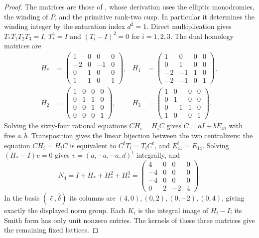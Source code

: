 \begin{proof}
The matrices are those of \citet[Proposition~4.2]{ViaTwo26push}, whose
derivation uses the elliptic monodromies, the winding of $P$,
and the primitive rank-two cusp.  In particular it determines
the winding integer by the saturation index $d^2=1$.  Direct multiplication gives
$T_*T_1T_2T_3=I$, $T_*^4=I$ and
$(T_i-I)^2=0$ for $i=1,2,3$.
The dual homology matrices are
\[
\begin{aligned}
 H_*&=\begin{pmatrix}1&0&0&0\\-2&0&-1&0\\0&1&0&0\\1&1&0&1\end{pmatrix},&
 H_1&=\begin{pmatrix}1&0&0&0\\0&1&0&0\\-2&-1&1&0\\-2&-1&0&1\end{pmatrix},\\
 H_2&=\begin{pmatrix}1&0&0&0\\0&1&1&0\\0&0&1&0\\0&0&0&1\end{pmatrix},&
 H_3&=\begin{pmatrix}1&0&0&0\\0&1&0&0\\0&-1&1&0\\1&0&0&1\end{pmatrix}.
\end{aligned}
\]
Solving the sixty-four rational equations $CH_i=H_iC$
gives $C=aI+bE_{41}$ with free $a,b$. Transposition gives the
linear bijection between the two centralizers: the equation
$CH_i=H_iC$ is equivalent to $C^tT_i=T_iC^t$, and
$E_{41}^t=E_{14}$.  Solving $(H_*-I)v=0$ gives
$v=(a,-a,-a,d)^t$ integrally, and
\[
 N_4=I+H_*+H_*^2+H_*^3
 =\begin{pmatrix}4&0&0&0\\-4&0&0&0\\-4&0&0&0\\0&2&-2&4\end{pmatrix}.
\]
In the basis $(\ell,\widehat\delta)$ its columns are
$(4,0),(0,2),(0,-2),(0,4)$, giving exactly the displayed
norm group.  Each $K_i$ is the integral image of
$H_i-I$; its Smith form has only unit nonzero entries.
The kernels of these three matrices give the remaining fixed
lattices.

\end{proof}